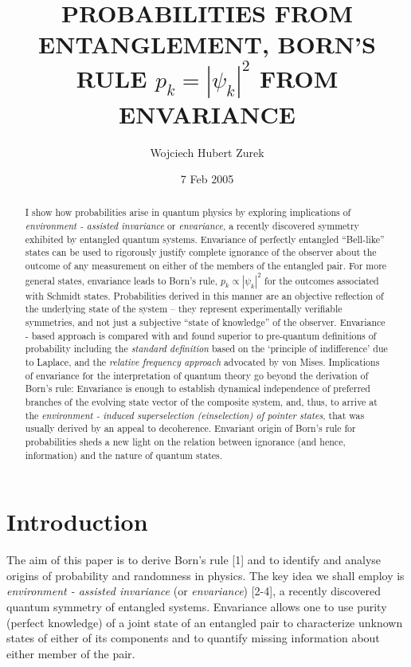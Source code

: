 \documentclass[aps,pra,epsfig,11pt,floatfix]{revtex4}
\begin{document}
\title{ PROBABILITIES FROM ENTANGLEMENT, BORN'S RULE $p_k=|\psi_k|^2$ FROM ENVARIANCE}
\author{Wojciech Hubert Zurek}

    \address{Theory Division, MS B210, LANL
    Los Alamos, NM, 87545, U.S.A.}

\date{7 Feb 2005}

\begin{abstract}
I show how probabilities arise in quantum physics by exploring implications
of {\it environment - assisted invariance} or {\it envariance},
a recently discovered symmetry exhibited by entangled quantum systems.
Envariance of perfectly entangled ``Bell-like'' states can be used to rigorously justify
complete ignorance of the observer about the outcome of any measurement
on either of the members of the entangled pair. For more general states, envariance 
leads to Born's rule, $p_k \propto |\psi_k|^2$ for the outcomes associated with
Schmidt states. Probabilities derived in this manner are an
objective reflection of the underlying state of the system -- they represent
experimentally verifiable symmetries, and not just a subjective ``state of
knowledge'' of the observer. Envariance - based approach is compared with
and found superior to pre-quantum definitions of probability including
the {\it standard definition} based on the `principle of indifference' due
to Laplace, and the {\it relative frequency approach} advocated by von Mises.
Implications of envariance for the interpretation of quantum theory go beyond
the derivation of Born's rule: Envariance is enough to establish dynamical
independence of preferred branches of the evolving state vector of
the composite system, and, thus, to arrive at the {\it environment - induced
superselection (einselection) of pointer states}, that was usually derived
by an appeal to decoherence. Envariant origin of Born's rule for probabilities
sheds a new light on the relation between ignorance (and hence, information)
and the nature of quantum states.
\end{abstract}
\maketitle

\parskip 12pt
\parindent 0pt

\section{Introduction}

The aim of this paper is to derive Born's rule [1] and to identify and analyse
origins of probability and randomness in physics. The key idea we shall employ
is {\it environment - assisted invariance} (or {\it envariance}) [2-4],
a recently discovered quantum symmetry of entangled systems.  Envariance
allows one to use purity (perfect knowledge) of a joint state of an entangled pair 
to characterize unknown states of either of its components and to quantify
missing information about either member of the pair.
\end{document}
